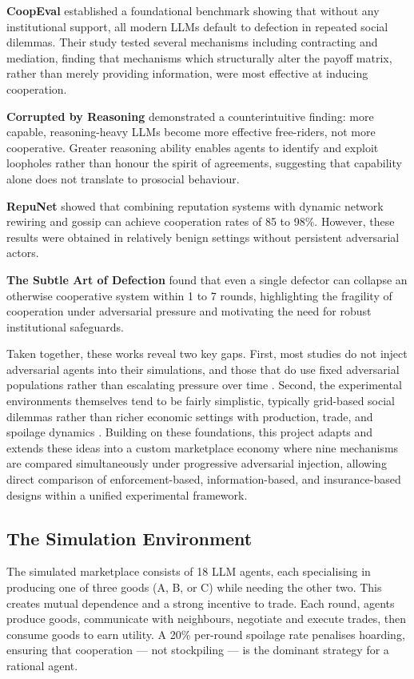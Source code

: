 \documentclass[12pt,a4paper]{article}
\begin{document}
\textbf{CoopEval} \cite{coopeval} established a foundational benchmark showing that without any institutional support, all modern LLMs default to defection in repeated social dilemmas. Their study tested several mechanisms including contracting and mediation, finding that mechanisms which structurally alter the payoff matrix, rather than merely providing information, were most effective at inducing cooperation.

\textbf{Corrupted by Reasoning} \cite{corrupted} demonstrated a counterintuitive finding: more capable, reasoning-heavy LLMs become more effective free-riders, not more cooperative. Greater reasoning ability enables agents to identify and exploit loopholes rather than honour the spirit of agreements, suggesting that capability alone does not translate to prosocial behaviour.

\textbf{RepuNet} \cite{repunet} showed that combining reputation systems with dynamic network rewiring and gossip can achieve cooperation rates of 85 to 98\%. However, these results were obtained in relatively benign settings without persistent adversarial actors.

\textbf{The Subtle Art of Defection} \cite{subtleart} found that even a single defector can collapse an otherwise cooperative system within 1 to 7 rounds, highlighting the fragility of cooperation under adversarial pressure and motivating the need for robust institutional safeguards.

Taken together, these works reveal two key gaps. First, most studies do not inject adversarial agents into their simulations, and those that do use fixed adversarial populations rather than escalating pressure over time \cite{repunet}. Second, the experimental environments themselves tend to be fairly simplistic, typically grid-based social dilemmas rather than richer economic settings with production, trade, and spoilage dynamics \cite{coopeval}. Building on these foundations, this project adapts and extends these ideas into a custom marketplace economy where nine mechanisms are compared simultaneously under progressive adversarial injection, allowing direct comparison of enforcement-based, information-based, and insurance-based designs within a unified experimental framework.

\subsection*{The Simulation Environment}

The simulated marketplace consists of 18 LLM agents, each specialising in producing one of three goods (A, B, or C) while needing the other two. This creates mutual dependence and a strong incentive to trade. Each round, agents produce goods, communicate with neighbours, negotiate and execute trades, then consume goods to earn utility. A 20\% per-round spoilage rate penalises hoarding, ensuring that cooperation --- not stockpiling --- is the dominant strategy for a rational agent.
\end{document}
